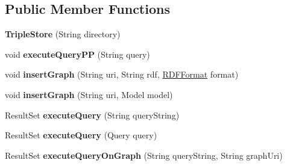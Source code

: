 \subsection*{Public Member Functions}
\begin{DoxyCompactItemize}
\item 
{\bfseries Triple\+Store} (String directory)\hypertarget{classeu_1_1h2020_1_1symbiote_1_1ontology_1_1model_1_1TripleStore_a625a85b97ad3228d7368b053bea0d399}{}\label{classeu_1_1h2020_1_1symbiote_1_1ontology_1_1model_1_1TripleStore_a625a85b97ad3228d7368b053bea0d399}

\item 
void {\bfseries execute\+Query\+PP} (String query)\hypertarget{classeu_1_1h2020_1_1symbiote_1_1ontology_1_1model_1_1TripleStore_abfcf9b64a71582ef1c37dae8e74902b7}{}\label{classeu_1_1h2020_1_1symbiote_1_1ontology_1_1model_1_1TripleStore_abfcf9b64a71582ef1c37dae8e74902b7}

\item 
void {\bfseries insert\+Graph} (String uri, String rdf, \hyperlink{enumeu_1_1h2020_1_1symbiote_1_1ontology_1_1model_1_1RDFFormat}{R\+D\+F\+Format} format)\hypertarget{classeu_1_1h2020_1_1symbiote_1_1ontology_1_1model_1_1TripleStore_a2564ec9b39ae1c39f540411c04a7a37a}{}\label{classeu_1_1h2020_1_1symbiote_1_1ontology_1_1model_1_1TripleStore_a2564ec9b39ae1c39f540411c04a7a37a}

\item 
void {\bfseries insert\+Graph} (String uri, Model model)\hypertarget{classeu_1_1h2020_1_1symbiote_1_1ontology_1_1model_1_1TripleStore_a29fbdfe06644b181d25e95ce42d6ba53}{}\label{classeu_1_1h2020_1_1symbiote_1_1ontology_1_1model_1_1TripleStore_a29fbdfe06644b181d25e95ce42d6ba53}

\item 
Result\+Set {\bfseries execute\+Query} (String query\+String)\hypertarget{classeu_1_1h2020_1_1symbiote_1_1ontology_1_1model_1_1TripleStore_aa3860b11c0cd7b238742fd291e4573a8}{}\label{classeu_1_1h2020_1_1symbiote_1_1ontology_1_1model_1_1TripleStore_aa3860b11c0cd7b238742fd291e4573a8}

\item 
Result\+Set {\bfseries execute\+Query} (Query query)\hypertarget{classeu_1_1h2020_1_1symbiote_1_1ontology_1_1model_1_1TripleStore_a3854eed46b4772d6d2c32858789d5714}{}\label{classeu_1_1h2020_1_1symbiote_1_1ontology_1_1model_1_1TripleStore_a3854eed46b4772d6d2c32858789d5714}

\item 
Result\+Set {\bfseries execute\+Query\+On\+Graph} (String query\+String, String graph\+Uri)\hypertarget{classeu_1_1h2020_1_1symbiote_1_1ontology_1_1model_1_1TripleStore_a8562e836131eabe86fa017c3de3af0b7}{}\label{classeu_1_1h2020_1_1symbiote_1_1ontology_1_1model_1_1TripleStore_a8562e836131eabe86fa017c3de3af0b7}


\end{DoxyCompactItemize}
